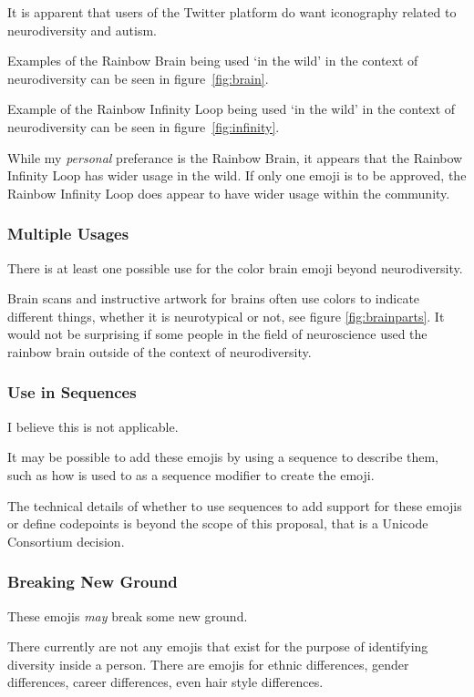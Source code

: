 It is apparent that users of the Twitter platform do want iconography related to neurodiversity
and autism.

Examples of the Rainbow Brain being used `in the wild' in the context of neurodiversity can be
seen in figure~\ref{fig:brain}.

Example of the Rainbow Infinity Loop being used `in the wild' in the context of neurodiversity
can be seen in figure~\ref{fig:infinity}.

While my \emph{personal} preferance is the Rainbow Brain, it appears that the Rainbow
Infinity Loop has wider usage in the wild. If only one emoji is to be approved, the Rainbow
Infinity Loop does appear to have wider usage within the community.


\subsubsection{Multiple Usages}

There is at least one possible use for the color brain emoji beyond neurodiversity.

Brain scans and instructive artwork for brains often use colors to indicate different things,
whether it is neurotypical or not, see figure \ref{fig:brainparts}. It would not be surprising
if some people in the field of neuroscience used the rainbow brain outside of the context
of neurodiversity.


\subsubsection{Use in Sequences}

I believe this is not applicable.

It may be possible to add these emojis by using a sequence to describe them, such as how
\rainbow{} is used to as a sequence modifier to create the
\prideflag{} emoji.

The technical details of whether to use sequences to add support for these emojis or define
codepoints is beyond the scope of this proposal, that is a Unicode Consortium decision.

\subsubsection{Breaking New Ground}

These emojis \emph{may} break some new ground.

There currently are not any emojis that exist for the purpose of identifying diversity inside
a person. There are emojis for ethnic differences, gender differences, career differences,
even hair style differences.

